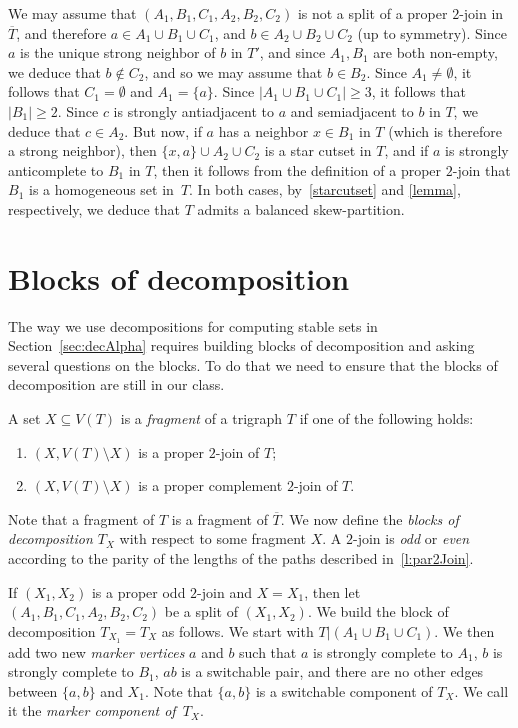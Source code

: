 \documentclass[11 pt] {article}
\newcommand\blackslug{\hbox{\hskip 1pt \vrule width 4pt height 8pt depth 1.5pt
        \hskip 1pt}}
\newcommand\bbox{\hfill \quad \blackslug \medbreak}
\begin{document}
We may assume that $(A_1,B_1,C_1, A_2,B_2, C_2)$ is
not a split of a proper $2$-join in $\overline{T}$, and therefore $a
\in A_1 \cup B_1 \cup C_1$, and $b \in A_2 \cup B_2 \cup C_2$ (up to
symmetry). Since $a$ is the unique strong neighbor of $b$ in $T'$, and
since $A_1,B_1$ are both non-empty, we deduce that $b \not \in C_2$,
and so we may assume that $b \in B_2$. Since $A_1 \neq \emptyset$, it
follows that $C_1 = \emptyset$ and $A_1=\{a\}$.  Since $|A_1 \cup B_1 \cup C_1|
\geq 3$, it follows that $|B_1|\geq 2$.  Since $c$ is strongly
antiadjacent to $a$ and semiadjacent to $b$ in $T$, we deduce that $c \in
A_2$. But now, if $a$ has a neighbor $x \in B_1$ in $T$ (which is therefore a
strong neighbor), then $\{x,a\} \cup A_2 \cup C_2$ is a star cutset
in $T$, and if $a$ is strongly anticomplete to $B_1$ in $T$, then it follows
from the definition of a proper $2$-join that $B_1$ is a 
homogeneous set in~$T$. In both cases, by~\ref{starcutset} and
\ref{lemma}, respectively, we deduce that $T$ admits a balanced
skew-partition.
\bbox


\section{Blocks of decomposition}
\label{sec:BlockDec}

The way we use decompositions for computing stable sets in
Section~\ref{sec:decAlpha} requires building blocks of decomposition
and asking several questions on the blocks. To do that
we need to ensure that the blocks of decomposition are still in our class.
 
A set $X\subseteq V(T)$ is a \emph{fragment} of a trigraph $T$ if
one of the following holds:
\begin{enumerate}
\item\label{i:2J} $(X,V(T)\setminus X)$ is a proper $2$-join of $T$;
\item\label{i:C2J} $(X,V(T)\setminus X)$ is a proper complement $2$-join of $T$.
\end{enumerate}

Note that a fragment of $T$ is a fragment of $\overline{T}$. We now
define the \emph{blocks of decomposition $T_X$} with respect to some
fragment $X$.  A $2$-join is \emph{odd} or \emph{even} according to
the parity of the lengths of the paths described in~\ref{l:par2Join}.

If $(X_1,X_2)$ is a proper odd $2$-join and $X=X_1$, then let
$(A_1,B_1,C_1,A_2,B_2,C_2)$ be a split of $(X_1, X_2)$. We build the
block of decomposition $T_{X_1}=T_X$ as follows. We start with $T |(
A_1\cup B_1\cup C_1)$. We then add two new \emph{marker vertices} $a$
and $b$ such that $a$ is strongly complete to $A_1$, $b$ is strongly
complete to $B_1$, $ab$ is a switchable pair, and there are no other 
edges between $\{a,b\}$ and $X_1$.  Note that $\{a, b\}$
is a switchable component of $T_X$.  We call it the \emph{marker
  component of~$T_X$}.   
\end{document}

